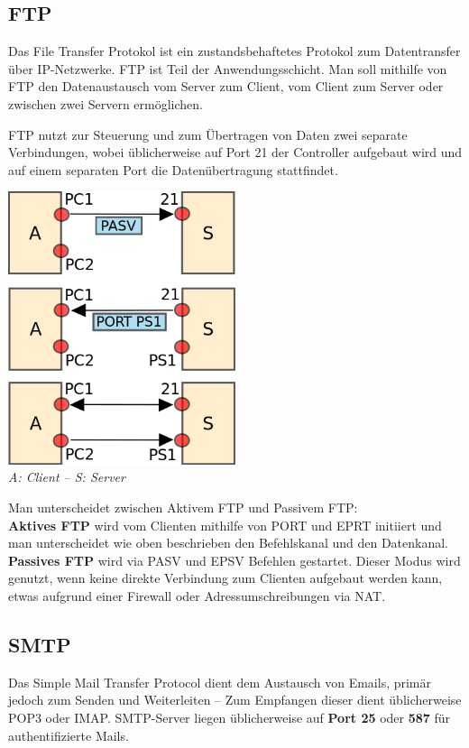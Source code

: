 \documentclass{scrartcl}
\begin{document}
 

    \subsection{FTP}
    \label{protocols:ftp}
    Das File Transfer Protokol ist ein zustandsbehaftetes Protokol zum Datentransfer über IP-Netzwerke. 
    FTP ist Teil der Anwendungsschicht.
    Man soll mithilfe von FTP den Datenaustausch vom Server zum Client, 
    vom Client zum Server oder zwischen zwei Servern ermöglichen.
    
    FTP nutzt zur Steuerung und zum Übertragen von Daten zwei separate Verbindungen, wobei üblicherweise auf Port 21 der Controller aufgebaut wird und auf einem separaten Port die Datenübertragung stattfindet.
    \begin{center}
        \includegraphics[width=0.5\textwidth]{FTPConnectionBuildup.png}\\
        \textit{A: Client -- S: Server\\}
    \end{center}
    
    Man unterscheidet zwischen Aktivem FTP und Passivem FTP:\\
    \textbf{Aktives FTP} wird vom Clienten mithilfe von PORT und EPRT initiiert und man unterscheidet wie oben beschrieben den Befehlskanal und den Datenkanal.\\
\textbf{Passives FTP} wird via PASV und EPSV Befehlen gestartet. 
Dieser Modus wird genutzt, wenn keine direkte Verbindung zum Clienten aufgebaut werden kann, etwas aufgrund einer Firewall oder Adressumschreibungen via NAT.
    
    \subsection{SMTP}
    \label{protocols:smtp}
    Das Simple Mail Transfer Protocol dient dem Austausch von Emails, 
    primär jedoch zum Senden und Weiterleiten 
    -- Zum Empfangen dieser dient üblicherweise POP3 oder IMAP.
    SMTP-Server liegen üblicherweise auf \textbf{Port 25} oder \textbf{587} für authentifizierte Mails.
    
\end{document}
